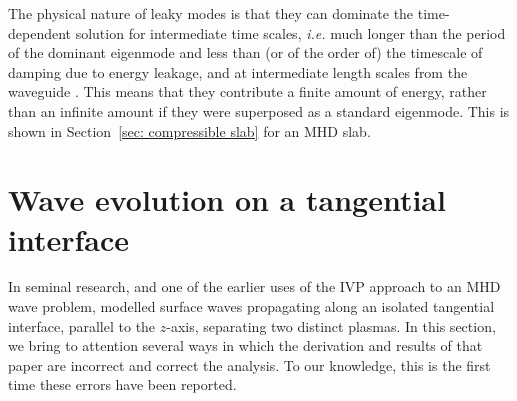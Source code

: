 The physical nature of leaky modes is that they can dominate the time-dependent solution for intermediate time scales, \textit{i.e.} much longer than the period of the dominant eigenmode and less than (or of the order of) the timescale of damping due to energy leakage, and at intermediate length scales from the waveguide \citep{rud_etal06b,rud_etal02}. This means that they contribute a finite amount of energy, rather than an infinite amount if they were superposed as a standard eigenmode. This is shown in Section~\ref{sec: compressible slab} for an MHD slab.


\section{Wave evolution on a tangential interface}
\label{sec: IVP int}

In seminal research, and one of the earlier uses of the IVP approach to an MHD wave problem, \cite{rae_etal81} modelled surface waves propagating along an isolated tangential interface, parallel to the $z$-axis, separating two distinct plasmas. In this section, we bring to attention several ways in which the derivation and results of that paper are incorrect and correct the analysis. To our knowledge, this is the first time these errors have been reported.

